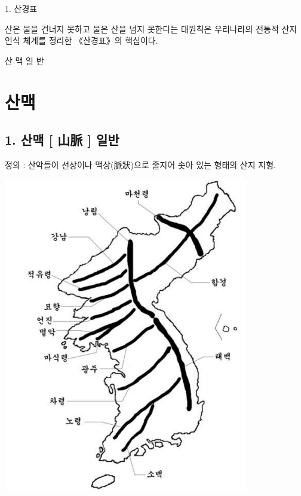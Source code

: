 \documentclass[12pt,a4paper]{book}
\newcommand{\SectionMargin}			{\newpage  \null \vskip 0cm}
\begin{document}
1. 		산경표

산은 물을 건너지 못하고 물은 산을 넘지 못한다는 대원칙은 우리나라의 전통적 산지 인식 체계를 정리한 《산경표》의 핵심이다.

산 맥 일 반











	\SectionMargin
	\section{산맥}
	\null


		\newpage  \null
		\subsection{1. 산맥 [ 山脈 ]  일반}
		\null


		정의 : 산악들이 선상이나 맥상(脈狀)으로 줄지어 솟아 있는 형태의 산지 지형.
		
				\includegraphics[width=0.8\textwidth]{./fig/fig__121.pdf}
\end{document}
